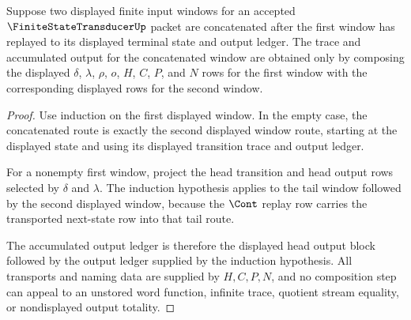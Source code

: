 \begin{theorem}
\label{thm:finite-state-transducer-window-composition-obligation}
Suppose two displayed finite input windows for an accepted $\FiniteStateTransducerUp$ packet are concatenated after the first window has replayed to its displayed terminal state and output ledger. The trace and accumulated output for the concatenated window are obtained only by composing the displayed $\delta$, $\lambda$, $\rho$, $o$, $H$, $C$, $P$, and $N$ rows for the first window with the corresponding displayed rows for the second window.
\end{theorem}
\begin{proof}
Use induction on the first displayed window. In the empty case, the concatenated route is exactly the second displayed window route, starting at the displayed state and using its displayed transition trace and output ledger.

For a nonempty first window, project the head transition and head output rows selected by $\delta$ and $\lambda$. The induction hypothesis applies to the tail window followed by the second displayed window, because the $\Cont$ replay row carries the transported next-state row into that tail route.

The accumulated output ledger is therefore the displayed head output block followed by the output ledger supplied by the induction hypothesis. All transports and naming data are supplied by $H,C,P,N$, and no composition step can appeal to an unstored word function, infinite trace, quotient stream equality, or nondisplayed output totality.
\end{proof}



